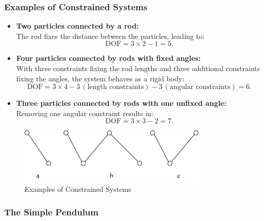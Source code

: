 \subsubsection*{Examples of Constrained Systems}

\begin{itemize}
    \item \textbf{Two particles connected by a rod:}\\[1mm]
          The rod fixes the distance between the particles, leading to:
          \begin{equation}
              \text{DOF} = 3\times2 - 1 = 5.
          \end{equation}

    \item \textbf{Four particles connected by rods with fixed angles:}\\[1mm]
          With three constraints fixing the rod lengths and three additional constraints fixing the angles, the system behaves as a rigid body:
          \begin{equation}
              \text{DOF} = 3\times4 - 3 \,(\text{length constraints}) - 3 \,(\text{angular constraints}) = 6.
          \end{equation}

    \item \textbf{Three particles connected by rods with one unfixed angle:}\\[1mm]
          Removing one angular constraint results in:
          \begin{equation}
              \text{DOF} = 3\times3 - 2 = 7.
          \end{equation}
\end{itemize}

\begin{figure}[ht]
    \centering
    \includegraphics[width=0.8\textwidth]{images/1-1-1.png}
    \caption{Examples of Constrained Systems}
    \label{fig:1-1-1}
\end{figure}

\subsubsection*{The Simple Pendulum}

